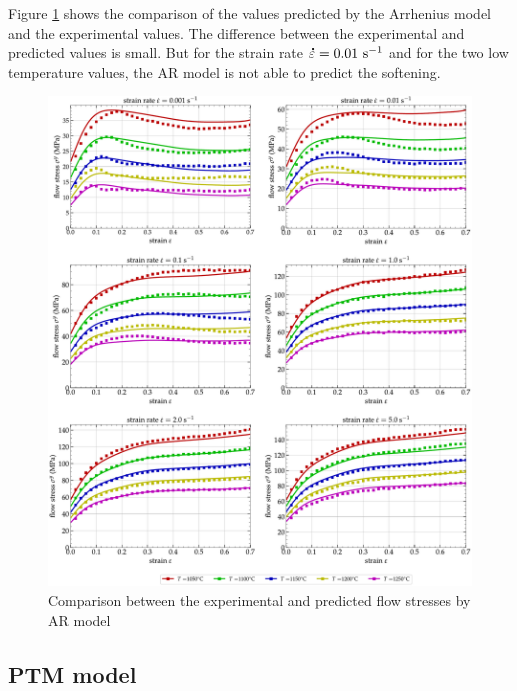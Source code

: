 \documentclass[twoside,english,1p,final,sort&compress]{elsarticle}
\theoremstyle{plain}
\newcommand{\mdot}[1]{\accentset{\mbox{\bfseries .}}{#1}}
\newcommand{\ps}{\text{s}^{-1}}
\begin{document}
Figure \ref{fig:iCorrelationAR} shows the comparison of the values predicted by the Arrhenius model and the experimental values.
The difference between the experimental and predicted values is small.
But for the strain rate $\mdot\varepsilon = 0.01~\ps$ and for the two low temperature values, the AR model is not able to predict the softening.

\begin{figure}[!ht]
\centering
\includegraphics[width=1.02\columnwidth]
{Figures/CompExp-AR-6}
\caption{Comparison between the experimental and predicted flow stresses by AR model}
\label{fig:iCorrelationAR}
\end{figure}

\subsection{PTM model\label{sec:PTM}}
\end{document}
